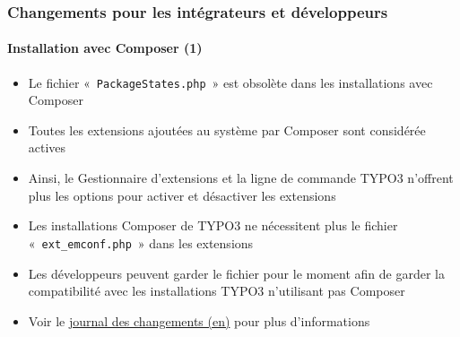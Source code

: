 %

\begin{frame}[fragile]
	\frametitle{Changements pour les intégrateurs et développeurs}
	\framesubtitle{Installation avec Composer (1)}


	\begin{itemize}
		\item Le fichier «~\texttt{PackageStates.php}~» est obsolète dans les installations
			avec Composer
		\item Toutes les extensions ajoutées au système par Composer sont considérée actives
		\item Ainsi, le Gestionnaire d'extensions et la ligne de commande TYPO3 n'offrent plus
			les options pour activer et désactiver les extensions
		\item Les installations Composer de TYPO3 ne nécessitent plus le fichier
			«~\texttt{ext\_emconf.php}~» dans les extensions
		\item Les développeurs peuvent garder le fichier pour le moment afin de garder la
			compatibilité avec les installations TYPO3 n'utilisant pas Composer
		\item Voir le
			\href{https://docs.typo3.org/c/typo3/cms-core/master/en-us/Changelog/11.4/Feature-94996-ConsiderAllComposerInstalledExtensionsAsActive.html}{journal des changements (en)}
			pour plus d'informations
	\end{itemize}
\end{frame}

